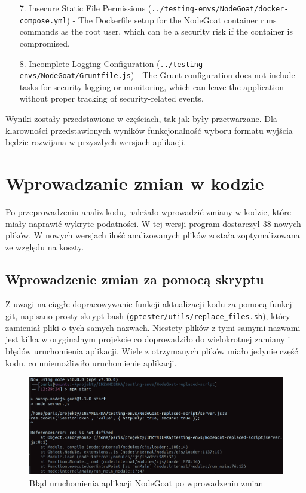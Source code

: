 \begin{enumerate}
  \item[7.] Insecure Static File Permissions (\texttt{../testing-envs/NodeGoat/docker-compose.yml}) - The Dockerfile setup for the NodeGoat container runs commands as the root user, which can be a security risk if the container is compromised.
  \item[8.] Incomplete Logging Configuration (\texttt{../testing-envs/NodeGoat/Gruntfile.js}) - The Grunt configuration does not include tasks for security logging or monitoring, which can leave the application without proper tracking of security-related events.
\end{enumerate}
Wyniki zostały przedstawione w częściach, tak jak były przetwarzane. Dla klarowności przedstawionych wyników funkcjonalność wyboru formatu wyjścia będzie rozwijana w przyszłych wersjach aplikacji.

\section{Wprowadzanie zmian w kodzie}
Po przeprowadzeniu analiz kodu, należało wprowadzić zmiany w kodzie, które miały naprawić wykryte podatności. W tej wersji program dostarczył 38 nowych plików. W nowych wersjach ilość analizowanych plików została zoptymalizowana ze względu na koszty.
\subsection{Wprowadzenie zmian za pomocą skryptu}
Z uwagi na ciągłe dopracowywanie funkcji aktualizacji kodu za pomocą funkcji git, napisano prosty skrypt bash (\texttt{gptester/utils/replace\_files.sh}), który zamieniał pliki o tych samych nazwach. Niestety plików z tymi samymi nazwami jest kilka w oryginalnym projekcie co doprowadziło do wielokrotnej zamiany i błędów uruchomienia aplikacji. Wiele z otrzymanych plików miało jedynie część kodu, co uniemożliwiło uruchomienie aplikacji.

\begin{figure}[H]
  \centering
  \includegraphics[width=\linewidth]{img/npm-start-error.png}
  \caption{Błąd uruchomienia aplikacji NodeGoat po wprowadzeniu zmian}
  \label{fig:nodegoat-error-after}
\end{figure}

